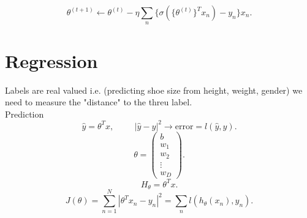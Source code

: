 \documentclass[a4paper,12pt]{scrartcl} %
\theoremstyle{darktheorem}
\begin{document}
\[
    \theta^{(t+1)} \leftarrow \theta^{(t)} - \eta \sum_{n}^{}\{\sigma(\{\theta^{(t)}\}^{T}x_n)-y_n\}x_n
.\]  
\section{Regression}
Labels are real valued i.e. (predicting shoe size from height, weight, gender)
we need to measure the "distance" to the threu label.\\
Prediction
\[
    \hat y = \theta^{T}x, \hspace{1cm} |\hat y - y|^2 \rightarrow \text{error} = l(\hat y, y)
.\] 
\[
\theta = \begin{pmatrix} b \\ w_1 \\ w_2 \\ \vdots \\ w_D \end{pmatrix} 
.\] 
\[
H_\theta = \theta^{T}x
.\] 
\[
J(\theta) = \sum_{n=1}^{N}|\theta^{T}x_n - y_n|^2 = \sum_{n}^{}l(h_\theta(x_n),y_n)
.\] 
\end{document}
